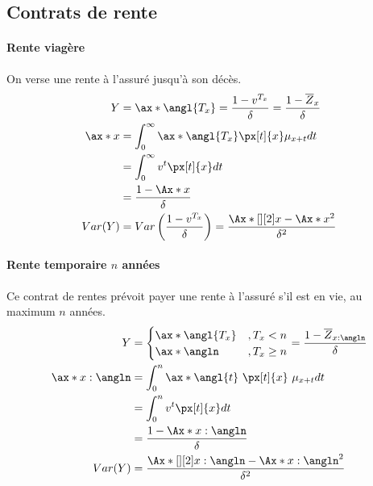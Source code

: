 \documentclass[10pt, french]{article}
\begin{document}
\begin{multicols*}{3}
\section{Contrats de rente}
\paragraph{Rente viagère} On verse une rente à l'assuré jusqu'à son décès. 
\begin{align*}
Y	&  = \ax*{\angl{T_{x}}} = \frac{1-v^{T_x}}{\delta} = \frac{1 -\overline{Z}_x}{\delta} \\
\ax*{x} & = \int_{0}^{\infty}  \ax*{\angl{T_{x}}}  \px[t]{x} \mu_{x+t} dt \\
	& = \int_{0}^{\infty} v^t \px[t]{x} dt \\
	& = \frac{1 - \Ax*{x}}{\delta} \\
Var(Y)	& = Var\left( \frac{1- v^{T_x}}{\delta} \right) =  \frac{\Ax*[][2]{x} - \Ax*{x}^2}{\delta^2} \\
\end{align*}

\paragraph{Rente temporaire $n$ années} Ce contrat de rentes prévoit payer une rente à l'assuré s'il est en vie, au maximum $n$ années.
\begin{align*}
Y & = \begin{cases}
\ax*{\angl{T_x}}	& , T_x < n \\
\ax*{\angln}			& , T_x \geq n \\
\end{cases} = \frac{1  - \overline{Z}_{x:\angln}}{\delta} \\
\ax*{x:\angln}	& = \int_{0}^{n} \ax*{\angl{t}} \  \px[t]{x} \  \mu_{x+t} dt \\
	& = \int_{0}^{n} v^t \px[t]{x} dt \\
	& = \frac{1 - \Ax*{x:\angln}}{\delta} \\
Var(Y)	& = \frac{\Ax*[][2]{x:\angln} - \Ax*{x:\angln}^2}{\delta^2} \\	
 \end{align*}


\end{multicols*}
\end{document}
